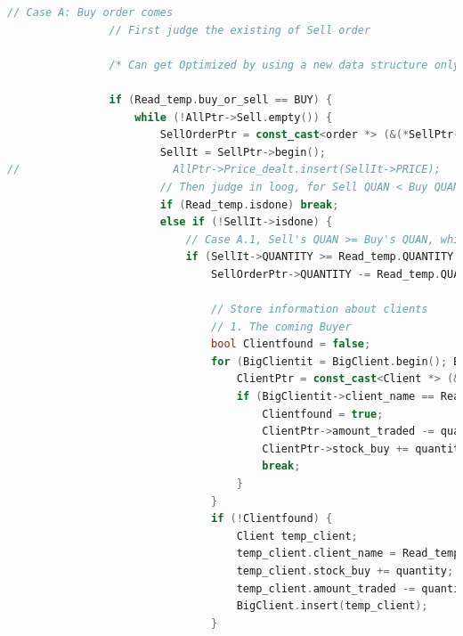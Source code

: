 \documentclass{article}
\begin{document}
\begin{lstlisting}[language=C++]
                // Case A: Buy order comes
                // First judge the existing of Sell order

                /* Can get Optimized by using a new data structure only to store the current trading*/

                if (Read_temp.buy_or_sell == BUY) {
                    while (!AllPtr->Sell.empty()) {
                        SellOrderPtr = const_cast<order *> (&(*SellPtr->begin()));
                        SellIt = SellPtr->begin();
//                        AllPtr->Price_dealt.insert(SellIt->PRICE);
                        // Then judge in loog, for Sell QUAN < Buy QUAN, should stop as long as the temp is done
                        if (Read_temp.isdone) break;
                        else if (!SellIt->isdone) {
                            // Case A.1, Sell's QUAN >= Buy's QUAN, which is always the final case.
                            if (SellIt->QUANTITY >= Read_temp.QUANTITY && Read_temp.PRICE >= SellIt->PRICE) {
                                SellOrderPtr->QUANTITY -= Read_temp.QUANTITY;

                                // Store information about clients
                                // 1. The coming Buyer
                                bool Clientfound = false;
                                for (BigClientit = BigClient.begin(); BigClientit != BigClient.end(); BigClientit++) {
                                    ClientPtr = const_cast<Client *> (&(*BigClientit));
                                    if (BigClientit->client_name == Read_temp.CLIENT_NAME) {
                                        Clientfound = true;
                                        ClientPtr->amount_traded -= quantity * SellIt->PRICE;
                                        ClientPtr->stock_buy += quantity;
                                        break;
                                    }
                                }
                                if (!Clientfound) {
                                    Client temp_client;
                                    temp_client.client_name = Read_temp.CLIENT_NAME;
                                    temp_client.stock_buy += quantity;
                                    temp_client.amount_traded -= quantity * SellIt->PRICE;
                                    BigClient.insert(temp_client);
                                }


\end{lstlisting}
\end{document}
